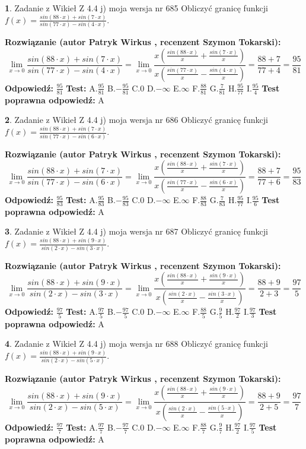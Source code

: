 \documentclass[12pt, a4paper]{article}
\theoremstyle{definition} %
\newtheorem{zad}{}
\newcommand{\zadStart}[1]{\begin{zad}#1\newline}
\newcommand{\zadStop}{\end{zad}}
\newcommand{\rozwStart}[2]{\noindent \textbf{Rozwiązanie (autor #1 , recenzent #2): }\newline}
\newcommand{\rozwStop}{\newline}
\newcommand{\odpStart}{\noindent \textbf{Odpowiedź:}\newline}
\newcommand{\odpStop}{\newline}
\newcommand{\testStart}{\noindent \textbf{Test:}\newline}
\newcommand{\testStop}{\newline}
\newcommand{\kluczStart}{\noindent \textbf{Test poprawna odpowiedź:}\newline}
\newcommand{\kluczStop}{\newline}
\begin{document}
\zadStart{Zadanie z Wikieł Z 4.4 j) moja wersja nr 685}
Obliczyć granicę funkcji $f(x)=\frac{sin(88\cdot x) +sin(7\cdot x)}{sin(77\cdot x) -sin(4\cdot x)}$.
\zadStop
\rozwStart{Patryk Wirkus}{Szymon Tokarski}
$$\lim\limits_{x\to 0}\frac{sin(88\cdot x) +sin(7\cdot x)}{sin(77\cdot x) -sin(4\cdot x)}=\lim\limits_{x\to 0}\frac{x(\frac{sin(88\cdot x)}{x}+\frac{sin(7\cdot x)}{x})}{x(\frac{sin(77\cdot x)}{x}-\frac{sin(4\cdot x)}{x})}=\frac{88+7}{77+4} = \frac{95}{81}$$
\rozwStop
\odpStart
$\frac{95}{81}$
\odpStop
\testStart
A.$\frac{95}{81}$
B.$-\frac{95}{81}$
C.$0$
D.$-\infty$
E.$\infty$
F.$\frac{88}{81}$
G.$\frac{7}{81}$
H.$\frac{95}{77}$
I.$\frac{95}{4}$
\testStop
\kluczStart
A
\kluczStop



\zadStart{Zadanie z Wikieł Z 4.4 j) moja wersja nr 686}
Obliczyć granicę funkcji $f(x)=\frac{sin(88\cdot x) +sin(7\cdot x)}{sin(77\cdot x) -sin(6\cdot x)}$.
\zadStop
\rozwStart{Patryk Wirkus}{Szymon Tokarski}
$$\lim\limits_{x\to 0}\frac{sin(88\cdot x) +sin(7\cdot x)}{sin(77\cdot x) -sin(6\cdot x)}=\lim\limits_{x\to 0}\frac{x(\frac{sin(88\cdot x)}{x}+\frac{sin(7\cdot x)}{x})}{x(\frac{sin(77\cdot x)}{x}-\frac{sin(6\cdot x)}{x})}=\frac{88+7}{77+6} = \frac{95}{83}$$
\rozwStop
\odpStart
$\frac{95}{83}$
\odpStop
\testStart
A.$\frac{95}{83}$
B.$-\frac{95}{83}$
C.$0$
D.$-\infty$
E.$\infty$
F.$\frac{88}{83}$
G.$\frac{7}{83}$
H.$\frac{95}{77}$
I.$\frac{95}{6}$
\testStop
\kluczStart
A
\kluczStop



\zadStart{Zadanie z Wikieł Z 4.4 j) moja wersja nr 687}
Obliczyć granicę funkcji $f(x)=\frac{sin(88\cdot x) +sin(9\cdot x)}{sin(2\cdot x) -sin(3\cdot x)}$.
\zadStop
\rozwStart{Patryk Wirkus}{Szymon Tokarski}
$$\lim\limits_{x\to 0}\frac{sin(88\cdot x) +sin(9\cdot x)}{sin(2\cdot x) -sin(3\cdot x)}=\lim\limits_{x\to 0}\frac{x(\frac{sin(88\cdot x)}{x}+\frac{sin(9\cdot x)}{x})}{x(\frac{sin(2\cdot x)}{x}-\frac{sin(3\cdot x)}{x})}=\frac{88+9}{2+3} = \frac{97}{5}$$
\rozwStop
\odpStart
$\frac{97}{5}$
\odpStop
\testStart
A.$\frac{97}{5}$
B.$-\frac{97}{5}$
C.$0$
D.$-\infty$
E.$\infty$
F.$\frac{88}{5}$
G.$\frac{9}{5}$
H.$\frac{97}{2}$
I.$\frac{97}{3}$
\testStop
\kluczStart
A
\kluczStop



\zadStart{Zadanie z Wikieł Z 4.4 j) moja wersja nr 688}
Obliczyć granicę funkcji $f(x)=\frac{sin(88\cdot x) +sin(9\cdot x)}{sin(2\cdot x) -sin(5\cdot x)}$.
\zadStop
\rozwStart{Patryk Wirkus}{Szymon Tokarski}
$$\lim\limits_{x\to 0}\frac{sin(88\cdot x) +sin(9\cdot x)}{sin(2\cdot x) -sin(5\cdot x)}=\lim\limits_{x\to 0}\frac{x(\frac{sin(88\cdot x)}{x}+\frac{sin(9\cdot x)}{x})}{x(\frac{sin(2\cdot x)}{x}-\frac{sin(5\cdot x)}{x})}=\frac{88+9}{2+5} = \frac{97}{7}$$
\rozwStop
\odpStart
$\frac{97}{7}$
\odpStop
\testStart
A.$\frac{97}{7}$
B.$-\frac{97}{7}$
C.$0$
D.$-\infty$
E.$\infty$
F.$\frac{88}{7}$
G.$\frac{9}{7}$
H.$\frac{97}{2}$
I.$\frac{97}{5}$
\testStop
\kluczStart
A
\kluczStop
\end{document}
